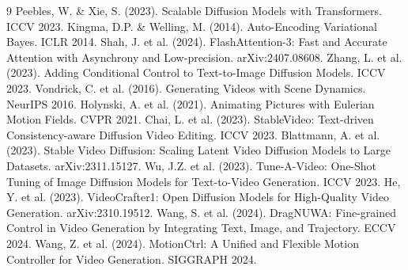 \documentclass[11pt,a4paper]{article}
\begin{document}
\begin{thebibliography}{9}
 Peebles, W. \& Xie, S. (2023). Scalable Diffusion Models with Transformers. ICCV 2023.
 Kingma, D.P. \& Welling, M. (2014). Auto-Encoding Variational Bayes. ICLR 2014.
 Shah, J. et al. (2024). FlashAttention-3: Fast and Accurate Attention with Asynchrony and Low-precision. arXiv:2407.08608.
 Zhang, L. et al. (2023). Adding Conditional Control to Text-to-Image Diffusion Models. ICCV 2023.
 Vondrick, C. et al. (2016). Generating Videos with Scene Dynamics. NeurIPS 2016.
 Holynski, A. et al. (2021). Animating Pictures with Eulerian Motion Fields. CVPR 2021.
 Chai, L. et al. (2023). StableVideo: Text-driven Consistency-aware Diffusion Video Editing. ICCV 2023.
 Blattmann, A. et al. (2023). Stable Video Diffusion: Scaling Latent Video Diffusion Models to Large Datasets. arXiv:2311.15127.
 Wu, J.Z. et al. (2023). Tune-A-Video: One-Shot Tuning of Image Diffusion Models for Text-to-Video Generation. ICCV 2023.
 He, Y. et al. (2023). VideoCrafter1: Open Diffusion Models for High-Quality Video Generation. arXiv:2310.19512.
 Wang, S. et al. (2024). DragNUWA: Fine-grained Control in Video Generation by Integrating Text, Image, and Trajectory. ECCV 2024.
 Wang, Z. et al. (2024). MotionCtrl: A Unified and Flexible Motion Controller for Video Generation. SIGGRAPH 2024.
\end{thebibliography}
\end{document}
